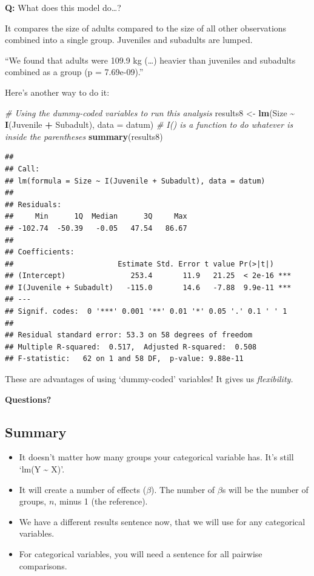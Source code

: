 \documentclass[
]{article}
\newenvironment{Shaded}{\begin{snugshade}}{\end{snugshade}}
\newcommand{\AttributeTok}[1]{\textcolor[rgb]{0.13,0.29,0.53}{#1}}
\newcommand{\CommentTok}[1]{\textcolor[rgb]{0.56,0.35,0.01}{\textit{#1}}}
\newcommand{\FunctionTok}[1]{\textcolor[rgb]{0.13,0.29,0.53}{\textbf{#1}}}
\newcommand{\NormalTok}[1]{#1}
\newcommand{\OtherTok}[1]{\textcolor[rgb]{0.56,0.35,0.01}{#1}}
\newcommand{\SpecialCharTok}[1]{\textcolor[rgb]{0.81,0.36,0.00}{\textbf{#1}}}
\begin{document}
\textbf{Q:} What does this model do\ldots?

It compares the size of adults compared to the size of all other
observations combined into a single group. Juveniles and subadults are
lumped.

``We found that adults were 109.9 kg (\ldots) heavier than juveniles and
subadults combined as a group (p = 7.69e-09).''

Here's another way to do it:

\begin{Shaded}
\begin{Highlighting}[]
\CommentTok{\# Using the dummy{-}coded variables to run this analysis}
\NormalTok{results8 }\OtherTok{\textless{}{-}} \FunctionTok{lm}\NormalTok{(Size }\SpecialCharTok{\textasciitilde{}} \FunctionTok{I}\NormalTok{(Juvenile }\SpecialCharTok{+}\NormalTok{ Subadult), }\AttributeTok{data =}\NormalTok{ datum)}
\CommentTok{\# I() is a function to do whatever is inside the parentheses}
\FunctionTok{summary}\NormalTok{(results8)}
\end{Highlighting}
\end{Shaded}

\begin{verbatim}
## 
## Call:
## lm(formula = Size ~ I(Juvenile + Subadult), data = datum)
## 
## Residuals:
##     Min      1Q  Median      3Q     Max 
## -102.74  -50.39   -0.05   47.54   86.67 
## 
## Coefficients:
##                        Estimate Std. Error t value Pr(>|t|)    
## (Intercept)               253.4       11.9   21.25  < 2e-16 ***
## I(Juvenile + Subadult)   -115.0       14.6   -7.88  9.9e-11 ***
## ---
## Signif. codes:  0 '***' 0.001 '**' 0.01 '*' 0.05 '.' 0.1 ' ' 1
## 
## Residual standard error: 53.3 on 58 degrees of freedom
## Multiple R-squared:  0.517,  Adjusted R-squared:  0.508 
## F-statistic:   62 on 1 and 58 DF,  p-value: 9.88e-11
\end{verbatim}

These are advantages of using `dummy-coded' variables! It gives us
\emph{flexibility.}

\textbf{Questions?}

\subsection{Summary}\label{summary-1}

\begin{itemize}
\item
  It doesn't matter how many groups your categorical variable has. It's
  still `lm(Y \textasciitilde{} X)'.
\item
  It will create a number of effects (\(\beta\)). The number of
  \(\beta\)s will be the number of groups, \(n\), minus 1 (the
  reference).
\item
  We have a different results sentence now, that we will use for any
  categorical variables.
\item
  For categorical variables, you will need a sentence for all pairwise
  comparisons.
\end{itemize}
\end{document}
